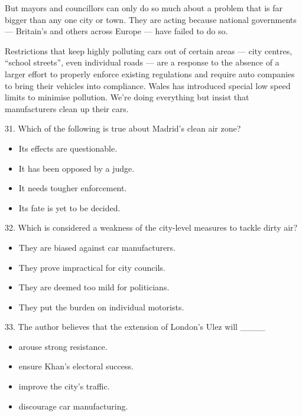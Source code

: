 \documentclass[UTF8,11pt]{ctexart}
\begin{document}
But mayors and councillors can only do so much about a problem that is far bigger than any one city or town. They are acting because national governments — Britain’s and others across Europe — have failed to do so.


Restrictions that keep highly polluting cars out of certain areas — city centres, “school streets”, even individual roads — are a response to the absence of a larger effort to properly enforce existing regulations and require auto companies to bring their vehicles into compliance. Wales has introduced special low speed limits to minimise pollution. We’re doing everything but insist that manufacturers clean up their cars.


31. Which of the following is true about Madrid’s clean air zone?


\begin{itemize}[leftmargin=2em,itemsep=.2em,topsep=.4em]\item[A.] Its effects are questionable.
\item[B.] It has been opposed by a judge.
\item[C.] It needs tougher enforcement.
\item[D.] Its fate is yet to be decided.
\end{itemize}

32. Which is considered a weakness of the city-level measures to tackle dirty air?


\begin{itemize}[leftmargin=2em,itemsep=.2em,topsep=.4em]\item[A.] They are biased against car manufacturers.
\item[B.] They prove impractical for city councils.
\item[C.] They are deemed too mild for politicians.
\item[D.] They put the burden on individual motorists.
\end{itemize}

33. The author believes that the extension of London’s Ulez will \_\_\_\_


\begin{itemize}[leftmargin=2em,itemsep=.2em,topsep=.4em]\item[A.] arouse strong resistance.
\item[B.] ensure Khan’s electoral success.
\item[C.] improve the city’s traffic.
\item[D.] discourage car manufacturing.
\end{itemize}
\end{document}
